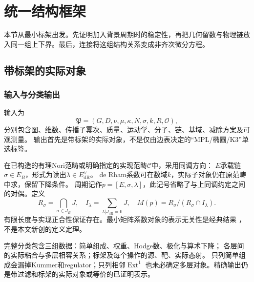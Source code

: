 \documentclass[11pt,a4paper,oneside]{ctexart}
\theoremstyle{cnplain}
\theoremstyle{definition}
\theoremstyle{remark}
\newcommand{\Q}{\mathbb Q}
\newcommand{\im}{\operatorname{im}}
\newcommand{\dR}{\mathrm{dR}}
\numberwithin{equation}{section}
\begin{document}
\section{统一结构框架}\label{ch:unified}
本节从最小标架出发。先证明加入背景周期时的稳定性，再把几何留数与物理链放入同一组上下界。最后，连接将这组结构关系变成非齐次微分方程。

\begingroup
\providecommand{\Q}{\mathbb Q}\providecommand{\cC}{\mathcal C}
\providecommand{\cS}{\mathcal S}\providecommand{\dR}{\mathrm{dR}}
\providecommand{\rk}{\operatorname{rk}}\providecommand{\im}{\operatorname{im}}
\subsection{带标架的实际对象}
\subsubsection{输入与分类输出}
输入为
\[
 \mathfrak P=(G,D,\nu,\mu,\kappa,N,\sigma,k,R,\mathcal O),
\]
分别包含图、维数、传播子幂次、质量、运动学、分子、链、基域、减除方案及可观测量。
输出首先是带标架的实际对象，不是仅由边表决定的“MPL/椭圆/K3”单选标签。

在已构造的有理Nori范畴或明确指定的实现范畴$\cC$中，采用同调方向：
$E$承载链$\sigma\in E_B$，形式为读出$\lambda\in E_{\dR}^{\vee}$。
de Rham系数可在数域$k$，实际子对象仍在原范畴中求，保留下降条件。
周期记作$p=[E,\sigma,\lambda]$，此记号省略了与上同调约定之间的对偶。定义
\[
 R_\sigma=\bigcap_{\sigma\in J_B}J,\quad
 I_\lambda=\sum_{\lambda|J_{\dR}=0}J,\quad
 M(p)=R_\sigma/(R_\sigma\cap I_\lambda).
\]
有限长度与实现正合性保证存在。最小矩阵系数对象的表示无关性是经典结果
\cite[\S2.4]{brownperiods}，不是本文新创的定义定理。

完整分类包含三组数据：简单组成、权重、Hodge数、极化与算术下降；
各层间的实际粘合与多层相容关系；标架及每个操作的源、靶、实际态射。
只列简单组成会漏掉Kummer和regulator；只列相邻$\operatorname{Ext}^1$
也未必确定多层对象。精确输出仍是带过滤和标架的实际对象或等价的已证明表示。
\end{document}
